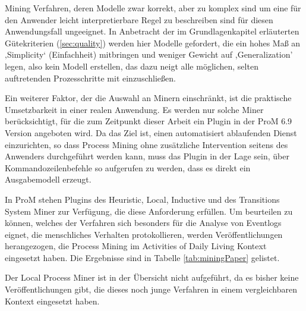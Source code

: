 Mining Verfahren, deren Modelle zwar korrekt, aber zu komplex sind um eine für den Anwender leicht interpretierbare Regel zu beschreiben sind für diesen Anwendungsfall ungeeignet. In Anbetracht der im Grundlagenkapitel erläuterten Gütekriterien (\ref{sec:quality}) werden hier Modelle gefordert, die ein hohes Maß an ‚Simplicity‘ (Einfachheit) mitbringen und weniger Gewicht auf ,Generalization' legen, also kein Modell erstellen, das dazu neigt alle möglichen, selten auftretenden Prozesschritte mit einzuschließen. 

Ein weiterer Faktor, der die Auswahl an Minern einschränkt, ist die praktische Umsetzbarkeit in einer realen Anwendung. Es werden nur solche Miner berücksichtigt, für die zum Zeitpunkt dieser Arbeit ein Plugin in der ProM 6.9 Version angeboten wird. Da das Ziel ist, einen automatisiert ablaufenden Dienst einzurichten, so dass Process Mining ohne zusätzliche Intervention seitens des Anwenders durchgeführt werden kann, muss das Plugin in der Lage sein, über Kommandozeilenbefehle so aufgerufen zu werden, dass es direkt ein Ausgabemodell erzeugt. 

In ProM stehen Plugins des Heuristic, Local, Inductive und des Transitions System Miner zur Verfügung, die diese Anforderung erfüllen. Um beurteilen zu können, welches der Verfahren sich besonders für die Analyse von Eventlogs eignet, die menschliches Verhalten protokollieren, werden Veröffentlichungen herangezogen, die Process Mining im Activities of Daily Living Kontext eingesetzt haben. Die Ergebnisse sind in Tabelle \ref{tab:miningPaper} gelistet. 

Der Local Process Miner ist in der Übersicht nicht aufgeführt, da es bisher keine Veröffentlichungen gibt, die dieses noch junge Verfahren in einem vergleichbaren Kontext eingesetzt haben. 

